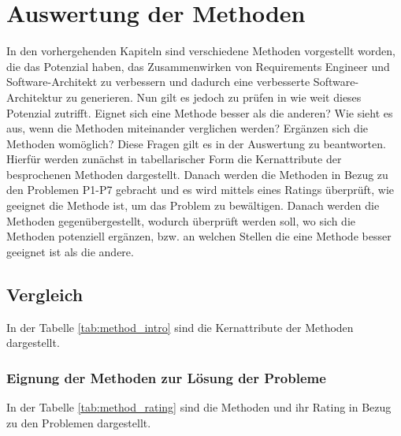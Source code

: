 \section{Auswertung der Methoden}\label{auswertung}
In den vorhergehenden Kapiteln sind verschiedene Methoden vorgestellt worden, die das Potenzial haben, das Zusammenwirken von Requirements Engineer und Software-Architekt zu verbessern und dadurch eine verbesserte Software-Architektur zu generieren. Nun gilt es jedoch zu pr\"ufen in wie weit dieses Potenzial zutrifft. Eignet sich eine Methode besser als die anderen? Wie sieht es aus, wenn die Methoden miteinander verglichen werden? Erg\"anzen sich die Methoden wom\"oglich? Diese Fragen gilt es in der Auswertung zu beantworten.\\

Hierf\"ur werden zun\"achst in tabellarischer Form die Kernattribute der besprochenen Methoden dargestellt. Danach werden die Methoden in Bezug zu den Problemen P1-P7 gebracht und es wird mittels eines Ratings \"uberpr\"uft, wie geeignet die Methode ist, um das Problem zu bew\"altigen. Danach werden die Methoden gegen\"ubergestellt, wodurch \"uberpr\"uft werden soll, wo sich die Methoden potenziell erg\"anzen, bzw. an welchen Stellen die eine Methode besser geeignet ist als die andere.\\ 

\subsection{Vergleich}
In der Tabelle \ref{tab:method_intro} sind die Kernattribute der Methoden dargestellt.\\

\subsubsection{Eignung der Methoden zur L\"osung der Probleme}
In der Tabelle \ref{tab:method_rating} sind die Methoden und ihr Rating in Bezug zu den Problemen dargestellt.\\

